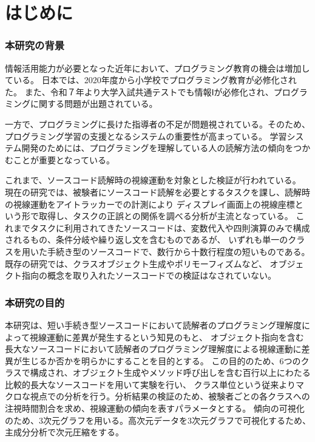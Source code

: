 \documentclass[paper=a4paper,fontsize=11pt]{jlreq}
\begin{document}
\tableofcontents
\clearpage

\part{はじめに}
  \section{本研究の背景}
    情報活用能力が必要となった近年において、プログラミング教育の機会は増加している。
    日本では、2020年度から小学校でプログラミング教育が必修化された\cite{syougaku_program}。
    また、令和７年より大学入試共通テストでも情報Ⅰが必修化され、プログラミングに関する問題が出題されている\cite{tusuto_mondai}。

    一方で、プログラミングに長けた指導者の不足が問題視されている。そのため、プログラミング学習の支援となるシステムの重要性が高まっている。
    学習システム開発のためには、プログラミングを理解している人の読解方法の傾向をつかむことが重要となっている。
    
    これまで、ソースコード読解時の視線運動を対象とした検証が行われている\cite{meiji2021}\cite{hanafusa}\cite{uwano}。
    現在の研究では、被験者にソースコード読解を必要とするタスクを課し、読解時の視線運動をアイトラッカーでの計測により
    ディスプレイ画面上の視線座標という形で取得し、タスクの正誤との関係を調べる分析が主流となっている。
    これまでタスクに利用されてきたソースコードは、変数代入や四則演算のみで構成されるもの、条件分岐や繰り返し文を含むものであるが、
    いずれも単一のクラスを用いた手続き型のソースコードで、数行から十数行程度の短いものである。既存の研究では、クラスオブジェクト生成やポリモーフィズムなど、
    オブジェクト指向の概念を取り入れたソースコードでの検証はなされていない。
  \clearpage
  
  \section{本研究の目的}
    本研究は、短い手続き型ソースコードにおいて読解者のプログラミング理解度によって視線運動に差異が発生するという知見のもと、
    オブジェクト指向を含む長大なソースコードにおいて読解者のプログラミング理解度による視線運動に差異が生じるか否かを明らかにすることを目的とする。
    この目的のため、6つのクラスで構成され、オブジェクト生成やメソッド呼び出しを含む百行以上にわたる比較的長大なソースコードを用いて実験を行い、
    クラス単位という従来よりマクロな視点での分析を行う。分析結果の検証のため、被験者ごとの各クラスへの注視時間割合を求め、視線運動の傾向を表すパラメータとする。
    傾向の可視化のため、3次元グラフを用いる。高次元データを3次元グラフで可視化するため、主成分分析で次元圧縮をする。
    \clearpage
\end{document}
